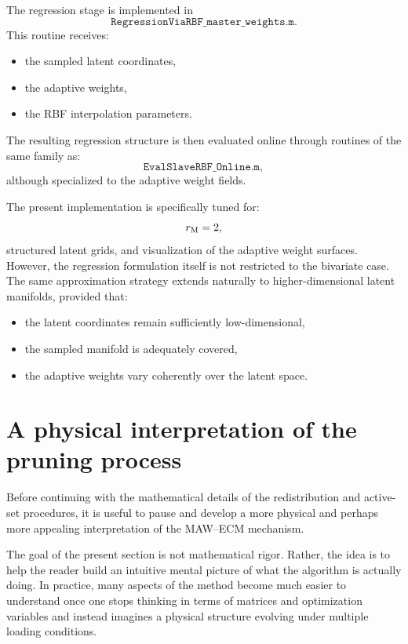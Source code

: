 \documentclass[11pt,a4paper]{article}
\begin{document}
The regression stage is implemented in
\[
        \texttt{RegressionViaRBF\_master\_weights.m}.
\]
This routine receives:
\begin{itemize}
    \item the sampled latent coordinates,
    \item the adaptive weights,
    \item the RBF interpolation parameters.
\end{itemize}

The resulting regression structure is then evaluated online through routines of
the same family as:
\[
        \texttt{EvalSlaveRBF\_Online.m},
\]
although specialized to the adaptive weight fields.

The present implementation is specifically tuned for:
\[
        r_{\mathrm{M}}=2,
\]
structured latent grids, and visualization of the adaptive weight surfaces.
However, the regression formulation itself is not restricted to the bivariate
case. The same approximation strategy extends naturally to higher-dimensional
latent manifolds, provided that:
\begin{itemize}
    \item the latent coordinates remain sufficiently low-dimensional,
    \item the sampled manifold is adequately covered,
    \item the adaptive weights vary coherently over the latent space.
\end{itemize}


\section{A physical interpretation of the pruning process}
\label{sec:physical_interpretation}

Before continuing with the mathematical details of the redistribution and
active-set procedures, it is useful to pause and develop a more physical and
perhaps more appealing interpretation of the MAW--ECM mechanism.

The goal of the present section is not mathematical rigor. Rather, the idea is
to help the reader build an intuitive mental picture of what the algorithm is
actually doing. In practice, many aspects of the method become much easier to
understand once one stops thinking in terms of matrices and optimization
variables and instead imagines a physical structure evolving under multiple
loading conditions.
\end{document}
